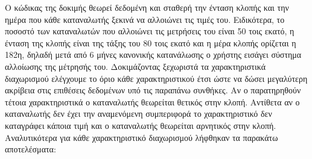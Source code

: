 \documentclass[a4paper, 11pt]{article}
\begin{document}
Ο κώδικας της δοκιμής θεωρεί δεδομένη και σταθερή την ένταση κλοπής και την ημέρα που κάθε καταναλωτής ξεκινά να αλλοιώνει τις τιμές του. Ειδικότερα, το ποσοστό των καταναλωτών που αλλοιώνει τις μετρήσεις του είναι 50 τοις εκατό, η ένταση της κλοπής είναι της τάξης του 80 τοις εκατό και η μέρα κλοπής ορίζεται η 182η, δηλαδή μετά από 6 μήνες κανονικής κατανάλωσης ο χρήστης εισάγει σύστημα αλλοίωσης της μέτρησής του. Δοκιμάζοντας ξεχωριστά τα χαρακτηριστικά διαχωρισμού ελέγχουμε το όριο κάθε χαρακτηριστικού έτσι ώστε να δώσει μεγαλύτερη ακρίβεια στις επιθέσεις δεδομένων υπό τις παραπάνω συνθήκες. Αν ο παρατηρηθούν τέτοια χαρακτηριστικά ο καταναλωτής θεωρείται θετικός στην κλοπή. Αντίθετα αν ο καταναλωτής δεν έχει την αναμενόμενη συμπεριφορά το χαρακτηριστικό δεν καταγράφει κάποια τιμή και ο καταναλωτής θεωρείται αρνητικός στην κλοπή. Αναλυτικότερα για κάθε χαρακτηριστικό διαχωρισμού λήφθηκαν τα παρακάτω αποτελέσματα:
\end{document}
